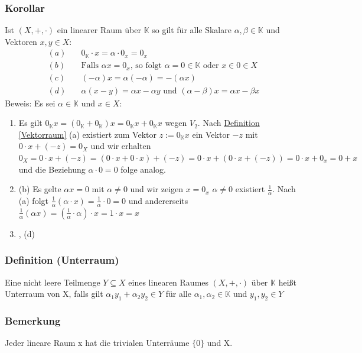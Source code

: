 \subsubsection{Korollar}
Ist $(X,+,\cdot )$ ein linearer Raum über $\mathbb{K}$ so gilt für alle Skalare $\alpha ,\beta \in\mathbb{K}$ und Vektoren $x,y\in X$:
\begin{align*}
(a)\quad& 0_{\mathbb{K}} \cdot x = \alpha \cdot 0_x = 0_x\\
(b)\quad& \text{Falls }\alpha x = 0_x\text{, so folgt } \alpha = 0\in\mathbb{K} \text{ oder } x\in 0 \in X \\
(c)\quad& (-\alpha )x = \alpha (-\alpha )=-(\alpha x)\\
(d)\quad& \alpha (x-y) = \alpha x - \alpha y \text{ und } (\alpha - \beta )x = \alpha x - \beta x
\end{align*}
Beweis: Es sei $\alpha \in \mathbb{K}$ und $x\in X$:
\renewcommand{\labelenumi}{(\alph{enumi})}
\begin{enumerate}
\item Es gilt $0_{\mathbb{K}} x = (0_{\mathbb{K}}+0_{\mathbb{K}})x = 0_{\mathbb{K}}x + 0_{\mathbb{K}}x$ wegen $V_2$. Nach \hyperref[Vektorraum]{Definition \ref*{Vektorraum}} (a) existiert zum Vektor $z:=0_{\mathbb{K}} x$ ein Vektor $-z$ mit $0\cdot x + (-z)=0_X$ und wir erhalten $0_X=0\cdot x + (-z) = (0\cdot x + 0\cdot x)+(-z) = 0\cdot x +(0\cdot x + (-z)) = 0\cdot x + 0_x = 0+x$ und die Beziehung $\alpha \cdot 0 = 0$ folge analog.
\item (b) Es gelte $\alpha x = 0$ mit $\alpha \neq 0$ und wir zeigen $x=0_x$ $\alpha \neq 0$ existiert $\frac{1}{\alpha}$. Nach (a) folgt ${\frac{1}{\alpha}} (\alpha \cdot x) = \frac{1}{\alpha} \cdot 0=0$ und andererseits $\frac{1}{\alpha} (\alpha x) = (\frac{1}{\alpha} \cdot \alpha) \cdot x=1\cdot x = x$
\item , (d)
\end{enumerate}
\subsubsection{Definition (Unterraum)}
Eine nicht leere Teilmenge $Y \subseteq X$ eines linearen Raumes $(X,+,\cdot)$ über $\mathbb{K}$ heißt Unterraum von X, falls gilt $\alpha_1 y_1 + \alpha_2 y_2 \in Y$ für alle $\alpha_1, \alpha_2\in\mathbb{K}$ und $y_1, y_2\in Y$
\subsubsection{Bemerkung}
Jeder lineare Raum x hat die trivialen Unterräume $\{0\}$ und X.

